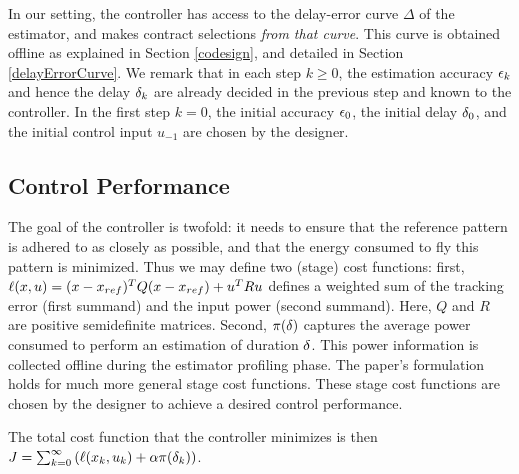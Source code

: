 In our setting, the controller has access to the delay-error curve $\Delta$ of the estimator, and makes contract selections \emph{from that curve}. 
This curve is obtained offline as explained in Section \ref{codesign}, and detailed in Section \ref{delayErrorCurve}.
We remark that in each step $k\geq0$, the estimation accuracy $\epsilon_k$
and hence the delay $\delta_k$ are already decided in the previous
step and known to the controller. 
In the first step $k=0$, the
initial accuracy $\epsilon_0$, the initial delay $\delta_0$, and
the initial control input $u_{-1}$ are chosen by the designer.

\subsection{Control Performance}
The goal of the controller is twofold: it needs to ensure that the reference pattern is adhered to as closely as possible, and that the energy consumed to fly this pattern is minimized.
Thus we may define two (stage) cost functions: first, $\ell(x, u) = (x - x_{ref})^TQ(x - x_{ref}) + u^T R u$ defines a weighted sum of the tracking error (first summand) and the input power (second summand). 
Here, $Q$ and $R$ are positive semidefinite matrices.
Second, $\pi(\delta)$ captures the average power consumed to perform an estimation of duration $\delta$. 
This power information is collected offline during the estimator profiling phase.
The paper's formulation holds for much more general stage cost functions.
These stage cost functions are chosen by the designer to achieve a desired control performance.

The total cost function that the controller minimizes is then
\(
J=\sum_{k=0}^{\infty}\left(\ell(x_k,u_k)+ \alpha \pi(\delta_k)\right)
\).

